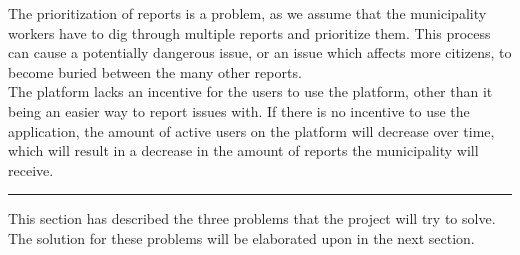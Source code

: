 The prioritization of reports is a problem, as we assume that the municipality workers have to dig through multiple reports and prioritize them. This process can cause a potentially dangerous issue, or an issue which affects more citizens, to become buried between the many other reports. 
~\\

The platform lacks an incentive for the users to use the platform, other than it being an easier way to report issues with. If there is no incentive to use the application, the amount of active users on the platform will decrease over time, which will result in a decrease in the amount of reports the municipality will receive.

\vspace{3em}

\hrule

This section has described the three problems that the project will try to solve. The solution for these problems will be elaborated upon in the next section.
